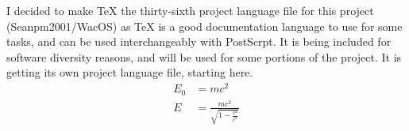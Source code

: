 \documentclass{article} %
\title{\ProjectLanguageFileThirtySix} %
\begin{document}
  \maketitle
  \I I decided to make TeX the thirty-sixth project language file for this project (Seanpm2001/WacOS) as TeX is a good documentation language to use for some tasks, and can be used interchangeably with PostScrpt. It is being included for software diversity reasons, and will be used for some portions of the project. It is getting its own project language file, starting here.
  \begin{align}
    E_0 &= mc^2 \\
    E &= \frac{mc^2}{\sqrt{1-\frac{v^2}{c^2}}}
  \end{align} 
\end{document}
